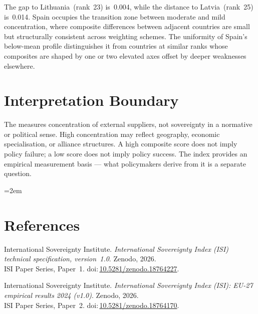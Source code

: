 \documentclass[12pt,a4paper]{article}
\begin{document}
The gap to Lithuania~(rank~23) is~0.004, while the distance to Latvia~(rank~25) is~0.014.  Spain occupies the transition zone between moderate and mild concentration, where composite differences between adjacent countries are small but structurally consistent across weighting schemes.  The uniformity of Spain's below-mean profile distinguishes it from countries at similar ranks whose composites are shaped by one or two elevated axes offset by deeper weaknesses elsewhere.


\section{Interpretation Boundary}
\label{sec:interpretation}

The \ISI measures concentration of external suppliers, not sovereignty in a normative or political sense.  High concentration may reflect geography, economic specialisation, or alliance structures.  A high composite score does not imply policy failure; a low score does not imply policy success.  The index provides an empirical measurement basis --- what policymakers derive from it is a separate question.


\clearpage
\vspace*{1.5cm}

\begingroup\emergencystretch=2em
\section*{References}

\begin{enumerate}[label={[\arabic*]},leftmargin=2em,itemsep=6pt]
\item International Sovereignty Institute.
  \textit{International Sovereignty Index (ISI) technical specification, version~1.0}.
  Zenodo, 2026.\\ISI Paper Series, Paper~1.
  doi:\,\href{https://doi.org/10.5281/zenodo.18764227}{10.5281/zenodo.18764227}.

\item International Sovereignty Institute.
  \textit{International Sovereignty Index (ISI): EU-27 empirical results 2024 (v1.0)}.
  Zenodo, 2026.\\ISI Paper Series, Paper~2.
  doi:\,\href{https://doi.org/10.5281/zenodo.18764170}{10.5281/zenodo.18764170}.
\end{enumerate}
\endgroup
\end{document}

